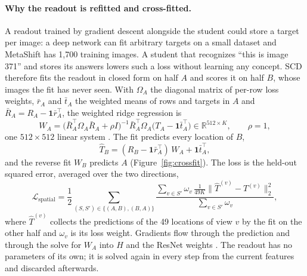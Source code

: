 \documentclass{article}
\begin{document}
\paragraph{Why the readout is refitted and cross-fitted.}
A readout trained by gradient descent alongside the student could store a target per image: a deep network can fit arbitrary targets on a small dataset \citep{zhang2017rethinking} and MetaShift has 1,700 training images. A student that recognizes ``this is image 371'' and stores its answers lowers such a loss without learning any concept. SCD therefore fits the readout in closed form on half $A$ and scores it on half $B$, whose images the fit has never seen. With $\Omega_A$ the diagonal matrix of per-row loss weights, $\bar r_A$ and $\bar t_A$ the weighted means of rows and targets in $A$ and $\bar R_A=R_A-\mathbf{1}\bar r_A^\top$, the weighted ridge regression is
\begin{equation}
 W_A=\big(\bar R_A^\top\Omega_A\bar R_A+\rho I\big)^{-1}\bar R_A^\top\Omega_A\big(T_A-\mathbf{1}\bar t_A^\top\big)\in\mathbb{R}^{512\times K},
 \qquad \rho=1,
\end{equation}
one $512\times512$ linear system \citep{hoerl1970ridge}. The fit predicts every location of $B$,
\begin{equation}
 \hat T_B=(R_B-\mathbf{1}\bar r_A^\top)\,W_A+\mathbf{1}\bar t_A^\top,
\end{equation}
and the reverse fit $W_B$ predicts $A$ (Figure~\ref{fig:crossfit}). The loss is the held-out squared error, averaged over the two directions,
\begin{equation}
 \mathcal{L}_{\mathrm{spatial}}=\frac{1}{2}\sum_{(S,S')\in\{(A,B),(B,A)\}}
 \frac{\sum_{v\in S'}\omega_v\,\frac{1}{49K}\big\lVert\hat T^{(v)}-T^{(v)}\big\rVert_2^2}{\sum_{v\in S'}\omega_v},
\end{equation}
where $\hat T^{(v)}$ collects the predictions of the 49 locations of view $v$ by the fit on the other half and $\omega_v$ is its loss weight. Gradients flow through the prediction and through the solve for $W_A$ into $H$ and the ResNet weights \citep{bertinetto2019r2d2}. The readout has no parameters of its own; it is solved again in every step from the current features and discarded afterwards.
\end{document}
